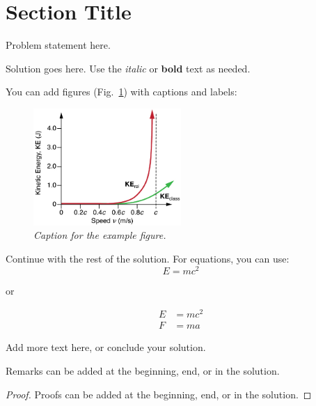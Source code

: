 
\section{Section Title}

\vspace{0.9cm}
\begin{p}
  Problem statement here.
\end{p}

\begin{solution}
  Solution goes here. Use the \emph{italic} or \textbf{bold} text as needed.
  
  You can add figures (Fig.~\ref{fig:example}) with captions and labels:
  \begin{figure}[H]
    \centering
    \includegraphics[width=0.5\textwidth]{figures/example.jpg}
    \caption{\emph{Caption for the example figure.}}
    \label{fig:example}
  \end{figure}

  Continue with the rest of the solution. For equations, you can use:
  \begin{equation}
    E = mc^2
  \end{equation}

  or 

  \begin{align*}
    E &= mc^2 \\
    F &= ma
  \end{align*}

  
  Add more text here, or conclude your solution.

\end{solution}

\begin{remark}
  Remarks can be added at the beginning, end, or in the solution.
\end{remark}

\vspace{\lineskip}

\begin{proof}
  Proofs can be added at the beginning, end, or in the solution.
\end{proof}


